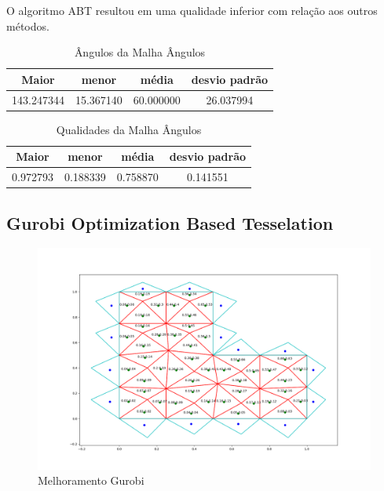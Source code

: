 O algoritmo ABT resultou em uma qualidade inferior com relação aos outros métodos.

\begin{table}[hb]
\centering
\par\caption{Ângulos da Malha Ângulos}
\begin{tabular}{c|c|c|c}
Maior&menor&média&desvio padrão\\\hline\hline
143.247344&15.367140&60.000000&26.037994\\\hline
\end{tabular}
\label{tab:angulos-malha-angulos}
\end{table}

\begin{table}[hb]
\centering
\par\caption{Qualidades da Malha Ângulos}
\begin{tabular}{c|c|c|c}
Maior&menor&média&desvio padrão\\\hline\hline
0.972793&0.188339&0.758870&0.141551\\\hline
\end{tabular}
\label{tab:qualidades-malha-angulos}
\end{table}

\newpage
\subsection{Gurobi Optimization Based Tesselation}

\begin{figure}[ht]
    \centering
    \includegraphics[width=1\linewidth]{fig/malha-gurobi.png}
    \caption{Melhoramento Gurobi}
    \label{fig:malha-gurobi}
\end{figure}

